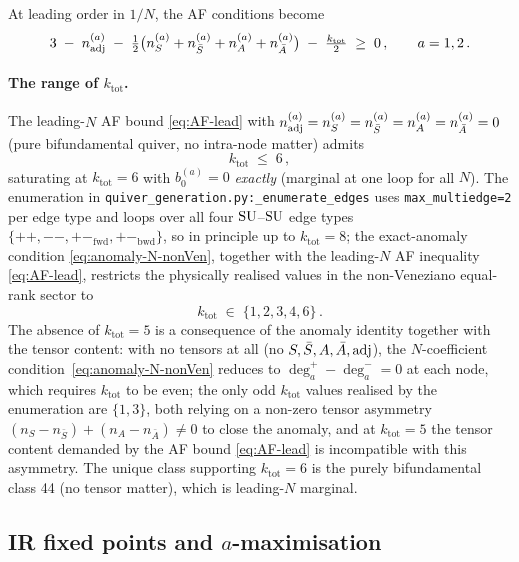 At leading order in $1/N$, the AF conditions become
\begin{equation}
  3\;-\;n_{\mathrm{adj}}^{(a)}\;-\;\tfrac{1}{2}\bigl(n_{S}^{(a)}+n_{\bar S}^{(a)}
  +n_{A}^{(a)}+n_{\bar A}^{(a)}\bigr)\;-\;\tfrac{k_{\text{tot}}}{2}
  \;\ge\;0\,,\qquad a=1,2\,.
  \label{eq:AF-lead}
\end{equation}

\paragraph{The range of $k_{\text{tot}}$.}
The leading-$N$ AF bound \eqref{eq:AF-lead} with
$n_{\mathrm{adj}}^{(a)}=n_{S}^{(a)}=n_{\bar S}^{(a)}=n_{A}^{(a)}=n_{\bar A}^{(a)}=0$
(pure bifundamental quiver, no intra-node matter) admits
\begin{equation}
  k_{\text{tot}}\;\le\;6\,,
  \label{eq:k-strict}
\end{equation}
saturating at $k_{\text{tot}}=6$ with $b_{0}^{(a)}=0$
\emph{exactly} (marginal at one loop for all $N$).  The enumeration
in \texttt{quiver\_generation.py:\_enumerate\_edges} uses
\texttt{max\_multiedge=2} per edge type and loops over all four
$\mathrm{SU}$--$\mathrm{SU}$ edge types $\{++,--,+-_{\text{fwd}},+-_{\text{bwd}}\}$,
so in principle up to $k_{\text{tot}}=8$; the exact-anomaly
condition \eqref{eq:anomaly-N-nonVen}, together with the leading-$N$
AF inequality \eqref{eq:AF-lead}, restricts the physically
realised values in the non-Veneziano equal-rank sector to
\begin{equation}
  k_{\text{tot}}\;\in\;\{1,2,3,4,6\}\,.
  \label{eq:k-values}
\end{equation}
The absence of $k_{\text{tot}}=5$ is a consequence of the anomaly
identity together with the tensor content: with no tensors at all
(no $S,\bar S,A,\bar A,\mathrm{adj}$), the $N$-coefficient
condition~\eqref{eq:anomaly-N-nonVen} reduces to $\deg^{+}_{a}
-\deg^{-}_{a}=0$ at each node, which requires $k_{\text{tot}}$ to be
even; the only odd $k_{\text{tot}}$ values realised by the enumeration
are $\{1,3\}$, both relying on a non-zero tensor asymmetry
$(n_{S}-n_{\bar S})+(n_{A}-n_{\bar A})\ne 0$ to close the anomaly,
and at $k_{\text{tot}}=5$ the tensor content demanded by the AF bound
\eqref{eq:AF-lead} is incompatible with this asymmetry.  The
unique class supporting $k_{\text{tot}}=6$ is the purely
bifundamental class 44 (no tensor matter), which is leading-$N$
marginal.

\subsection{IR fixed points and \texorpdfstring{$a$}{a}-maximisation}
\label{sec:setup-amax}


